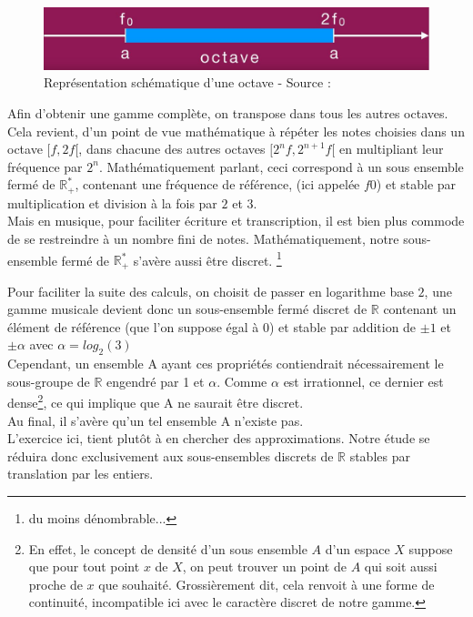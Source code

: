 \documentclass[moyen]{classeUPD}
\begin{document}
\begin{figure}[h!]
	\begin{center}
		\includegraphics[width=0.6\textheight]{Octave}
		\caption[Schématisation octave]{Représentation schématique d'une octave - Source : \cite{cordierphychi_fractions_nodate}}
		\label{figure 2}
	\end{center}
\end{figure}



Afin d’obtenir une gamme complète, on transpose dans tous les autres octaves. Cela revient, d’un point de vue mathématique à répéter les notes choisies dans un octave $[f,2f[$, dans chacune des autres octaves $[2^{n}f,2^{n+1}f[$ en multipliant leur fréquence par $2^n$.
Mathématiquement parlant, ceci correspond à un sous ensemble fermé de $\mathbb{R}_{+}^{*}$, contenant une fréquence de référence, (ici appelée $f0$) et stable par multiplication et division à la fois par $2$ et $3$.\\
Mais en musique, pour faciliter écriture et transcription, il est bien plus commode de se restreindre à un nombre fini de notes. Mathématiquement, notre sous-ensemble fermé de $\mathbb{R}_{+}^{*}$  s’avère aussi être discret. \footnote{du moins dénombrable... }
\par Pour faciliter la suite des calculs, on choisit de passer en logarithme base $2$, une gamme musicale devient donc un sous-ensemble fermé discret de $\mathbb{R}$ contenant un élément de référence (que l'on suppose égal à 0) et stable par addition de $\pm1$ et $\pm \alpha$ avec $\alpha=log_{2}(3)$\\
Cependant, un ensemble A ayant ces propriétés contiendrait nécessairement le sous-groupe de $\mathbb{R}$ engendré par 1 et $\alpha$. Comme $\alpha$ est irrationnel, ce dernier est dense\footnote{En effet, le concept de densité d'un sous ensemble $A$ d'un espace $X$ suppose que pour tout point $x$ de $X$, on peut trouver un point de $A$ qui soit aussi proche de $x$ que souhaité. Grossièrement dit, cela renvoit à une forme de continuité, incompatible ici avec le caractère discret de notre gamme.}, ce qui implique que A ne saurait être discret.\\

Au final, il s’avère qu'un tel ensemble A n'existe pas.\\
L’exercice ici, tient plutôt à en chercher des approximations. Notre étude se réduira donc exclusivement aux sous-ensembles discrets de $\mathbb{R}$ stables par translation par les entiers.\
\clearpage
\end{document}

